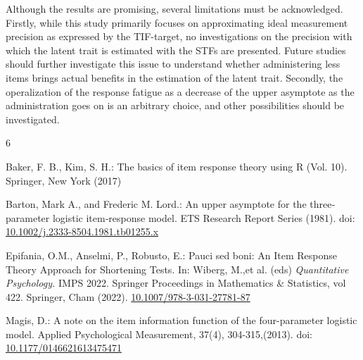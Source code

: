 \documentclass{svproc}
\begin{document}
Although the results are promising, several limitations must be acknowledged. Firstly, while this study primarily focuses on approximating ideal measurement precision as expressed by the TIF-target, no investigations on the precision with which the latent trait is estimated with the STFs are presented. Future studies should further investigate this issue to understand whether administering less items brings actual benefits in the estimation of the latent trait.
Secondly, the operalization of the response fatigue as a decrease of the upper asymptote as the administration goes on is an arbitrary choice, and other possibilities should be investigated.




%
\begin{thebibliography}{6}
%

Baker, F. B., Kim, S. H.: The basics of item response theory using R (Vol. 10). Springer, New York (2017)

Barton, Mark A., and Frederic M. Lord.: An upper asymptote for the three‐parameter logistic item‐response model. ETS Research Report Series (1981). doi: \url{10.1002/j.2333-8504.1981.tb01255.x}



Epifania, O.M., Anselmi, P., Robusto, E.: Pauci sed boni: An Item Response Theory Approach for Shortening Tests. In: Wiberg, M.,et al. (eds) \textit{Quantitative Psychology.} IMPS 2022. Springer Proceedings in Mathematics \& Statistics, vol 422. Springer, Cham (2022). \url{10.1007/978-3-031-27781-87}



Magis, D.: A note on the item information function of the four-parameter logistic model. Applied Psychological Measurement, 37(4), 304-315,(2013). doi: \url{10.1177/0146621613475471}






\end{thebibliography}
\end{document}
